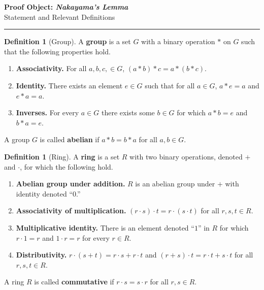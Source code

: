 \documentclass[12pt]{article}
\newcommand{\HRule}{\begin{center}\rule{\linewidth}{.01cm}\end{center}}
\theoremstyle{definition}
\newtheorem{definition}[theorem]{Definition}
\newtheorem{examples}[theorem]{Examples}
\theoremstyle{remark}
\begin{document}
\begin{center}
	{\large \textbf{Proof Object:  \emph{Nakayama's Lemma}} } \\ \vspace{.2cm} Statement and Relevant Definitions
\end{center}

\vspace{-.5cm}

\HRule


\begin{definition}[Group]
A \textbf{group} is a set $G$ with a binary operation $\ast$ on $G$ such that the following properties hold.
\begin{enumerate}[topsep=0cm,itemsep=0cm]
\item \textbf{Associativity.}  For all $a, b, c, \in G$, $(a \ast b) \ast c = a \ast (b \ast c)$.
\item \textbf{Identity.}  There exists an element $e \in G$ such that for all $a \in G$, $a \ast e = a$ and $e \ast a = a$.
\item \textbf{Inverses.}  For every $a \in G$ there exists some $b \in G$ for which $a \ast b  = e$ and $b \ast a = e$. 
\end{enumerate}
A group $G$ is called \textbf{abelian} if $a \ast b = b \ast a$ for all $a, b \in G$.
\end{definition}


\begin{definition}[Ring]
A \textbf{ring} is a set $R$ with two binary operations, denoted $+$ and $\cdot$, for which the following hold.
\begin{enumerate}[topsep=0cm,itemsep=0cm]
\item \textbf{Abelian group under addition.}  $R$ is an abelian group under $+$ with identity denoted ``$0$.''
\item \textbf{Associativity of multiplication.}  $(r \cdot s) \cdot t = r \cdot (s \cdot t)$ for all $r, s, t \in R$.
 \item \textbf{Multiplicative identity.}  There is an element  denoted ``$1$'' in $R$ for which $r \cdot 1 = r$ and $1 \cdot r = r$ for every $r \in R$. 
 \item \textbf{Distributivity.} $r \cdot (s + t) = r \cdot s + r \cdot t$ and  $(r + s) \cdot t = r \cdot t + s \cdot t$ for all $r, s, t \in R$.  
\end{enumerate}
A ring $R$ is called \textbf{commutative} if $r \cdot s = s \cdot r$ for all $r, s \in R$. 
\end{definition}
\end{document}
